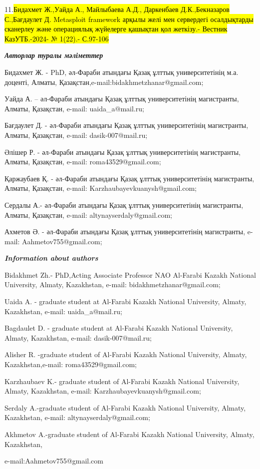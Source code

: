 11.\hl{Бидахмет Ж.,Уайда А., Майлыбаева А.Д., Даркенбаев Д.К.,Бекназаров
С.,Бағдаулет Д. Metasploit framework арқылы желі мен сервердегі
осалдықтарды сканерлеу және операциялық жүйелерге қашықтан қол жеткізу.-
Вестник КазУТБ.-2024- № 1(22).- С.97-106}

\emph{{\bfseries Авторлар туралы мәліметтер}}

Бидахмет Ж. - PhD, әл-Фараби атындағы Қазақ ұлттық университетінің м.а.
доценті, Алматы, Қазақстан,e-mail:bidakhmetzhanar@gmail.com;

Уайда А. -- әл-Фараби атындағы Қазақ ұлттық университетінің магистранты,
Алматы, Қазақстан, e-mail: uaida\_a@mail.ru;

Бағдаулет Д. - әл-Фараби атындағы Қазақ ұлттық университетінің
магистранты, Алматы, Қазақстан, e-mail: dasik-007@mail.ru;

Әлішер Р. - әл-Фараби атындағы Қазақ ұлттық университетінің магистранты,
Алматы, Қазақстан, e-mail: roma43529@gmail.com;

Қаржаубаев Қ. - әл-Фараби атындағы Қазақ ұлттық университетінің
магистранты, Алматы, Қазақстан, e-mail: Karzhaubayevkuanysh@gmail.com;

Сердалы А.- әл-Фараби атындағы Қазақ ұлттық университетінің магистранты,
Алматы, Қазақстан, e-mail: altynayserdaly@gmail.com;

Ахметов Ә. - әл-Фараби атындағы Қазақ ұлттық университетінің
магистранты, e-mail: Aahmetov755@gmail.com;

\emph{{\bfseries Information about authors}}

Bidakhmet Zh.- PhD,Acting Associate Professor NAO Al-Farabi Kazakh
National University, Almaty, Kazakhstan, e-mail:
bidakhmetzhanar@gmail.com;

Uaida A. - graduate student at Al-Farabi Kazakh National University,
Almaty, Kazakhstan, e-mail: uaida\_a@mail.ru;

Bagdaulet D. - graduate student at Al-Farabi Kazakh National University,
Almaty, Kazakhstan, e-mail: dasik-007@mail.ru;

Alisher R. -graduate student of Al-Farabi Kazakh National University,
Almaty, Kazakhstan,e-mail: roma43529@gmail.com;

Karzhaubaev K.- graduate student of Al-Farabi Kazakh National
University, Almaty, Kazakhstan, e-mail: Karzhaubayevkuanysh@gmail.com;

Serdaly A.-graduate student of Al-Farabi Kazakh National University,
Almaty, Kazakhstan, e-mail: altynayserdaly@gmail.com;

Akhmetov A.-graduate student of Al-Farabi Kazakh National University,
Almaty, Kazakhstan,

e-mail:Aahmetov755@gmail.com
